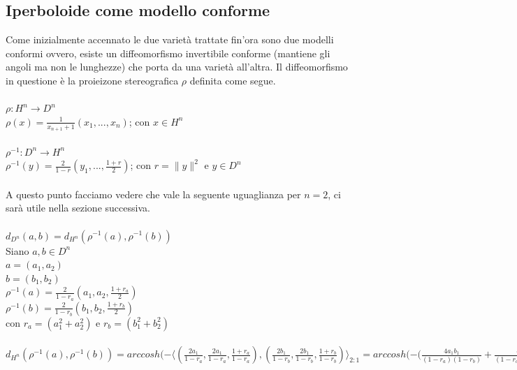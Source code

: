 \documentclass[a4paper, 12pt]{article}
\begin{document}
\subsection{Iperboloide come modello conforme}
Come inizialmente accennato le due varietà trattate fin'ora sono due modelli conformi ovvero, esiste un diffeomorfismo invertibile conforme (mantiene gli angoli ma non le lunghezze) che porta da una varietà all'altra. Il diffeomorfismo in questione è la proieizone stereografica $\rho$ definita come segue.\\\\
$\rho : H^n \to D^n$\\
$\rho(x) = \frac{1}{x_{n+1} + 1}(x_1, ..., x_n)$; con $x \in H^n$\\\\
$\rho^{-1} : D^n \to H^n$\\
$\rho^{-1}(y) = \frac{2}{1 - r}(y_1, ..., \frac{1+r}{2})$; con $r = \parallel y \parallel^2$ e $y \in D^n$\\\\
A questo punto facciamo vedere che vale la seguente uguaglianza per $n=2$, ci sarà utile nella sezione successiva.\\\\
$d_{D^n}(a, b) = d_{H^n}(\rho^{-1}(a), \rho^{-1}(b))$\\
Siano $a, b \in D^n$\\
$a = (a_1, a_2)$\\
$b = (b_1, b_2)$\\
$\rho^{-1}(a) = \frac{2}{1-r_a}(a_1, a_2, \frac{1 + r_a}{2})$\\
$\rho^{-1}(b) = \frac{2}{1-r_b}(b_1, b_2, \frac{1 + r_b}{2})$\\
con $r_a = (a_1^2 + a_2^2)$ e $r_b = (b_1^2 + b_2^2)$\\\\
$d_{H^n}(\rho^{-1}(a), \rho^{-1}(b)) = arccosh(-\langle (\frac{2a_1}{1-r_a}, \frac{2a_1}{1-r_a}, \frac{1+r_a}{1-r_a}), (\frac{2b_1}{1-r_b}, \frac{2b_1}{1-r_b}, \frac{1+r_b}{1-r_b}) \rangle_{2:1} = arccosh(- (\frac{4a_1b_1}{(1-r_a)(1-r_b)} + \frac{4a_2b_2}{(1-r_a)(1-r_b)} - \frac{(1+r_a)(1+r_b)}{(1-r_a)(1-r_b)} = arccosh(\frac{(1+r_a)(1+r_b) - 4a_1b_1 - 4a_2b_2}{(1-r_a)(1-r_b)}) = arccosh(\frac{1 + r_a +r_b + r_ar_b - 4a_1b_1 - 4a_2b_2}{1 - r_a - r_b + r_ar_b}) = arccosh(\frac{1 -r_a -r_b + 2r_a + 2r_b + r_ar_b - 4a_1b_1 - 4a_2b_2}{1 - r_a - r_b + r_ar_b}) = arccosh(1 + \frac{2r_a + 2r_b - 4a_1b_1 - 4a_2b_2}{(1-r_a)(1-r_b)} = arccosh(1 + 2 \frac{r_a + r_b - 2a_1b_1 - 2a_2b_2}{(1-r_a)(1-r_b)} = arccosh(1 + 2\frac{\parallel a - b \parallel^2}{(1 - \parallel a \parallel^2)(1 - \parallel b \parallel^2)} = d_{D^n}(a, b)$
\end{document}
